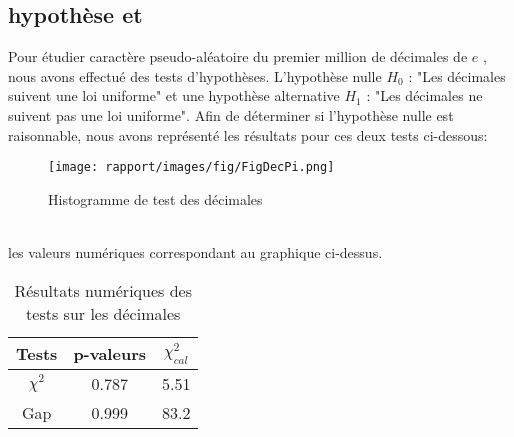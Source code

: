 \subsection{hypothèse et }

Pour étudier caractère pseudo-aléatoire du premier million de décimales de $e$ , nous avons effectué des tests d'hypothèses. L'hypothèse nulle $H_0$ : "Les décimales suivent une loi uniforme" et une hypothèse alternative $H_1$ : "Les décimales ne suivent pas une loi uniforme". Afin de déterminer si l'hypothèse nulle est raisonnable, nous avons représenté les résultats pour ces deux tests ci-dessous:

\begin{figure}[!h]
    \centering
    \texttt{[image: rapport/images/fig/FigDecPi.png]}
    \caption{Histogramme de test des décimales}
    \label{enter-label}
\end{figure}
\\

  les valeurs numériques correspondant au graphique ci-dessus.

\begin{table}[!h]
    \centering
    \begin{tabular}{ccc}
        \hline
        Tests & p-valeurs & $\chi^2_{cal}$ \\
        \hline
        $\chi^2$ & 0.787 & 5.51  \\
        Gap & 0.999 & 83.2 \\
        \hline

    \end{tabular}
    \caption{Résultats numériques des tests sur les décimales}

\end{table}

